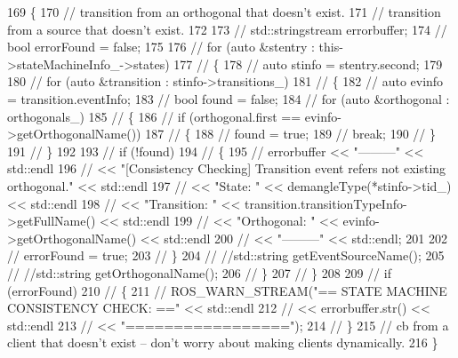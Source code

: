 \begin{DoxyCode}
169 \{
170     \textcolor{comment}{// transition from an orthogonal that doesn’t exist.}
171     \textcolor{comment}{// transition from a source that doesn’t exist.}
172 
173     \textcolor{comment}{// std::stringstream errorbuffer;}
174     \textcolor{comment}{// bool errorFound = false;}
175 
176     \textcolor{comment}{// for (auto &stentry : this->stateMachineInfo\_->states)}
177     \textcolor{comment}{// \{}
178     \textcolor{comment}{//     auto stinfo = stentry.second;}
179 
180     \textcolor{comment}{//     for (auto &transition : stinfo->transitions\_)}
181     \textcolor{comment}{//     \{}
182     \textcolor{comment}{//         auto evinfo = transition.eventInfo;}
183     \textcolor{comment}{//         bool found = false;}
184     \textcolor{comment}{//         for (auto &orthogonal : orthogonals\_)}
185     \textcolor{comment}{//         \{}
186     \textcolor{comment}{//             if (orthogonal.first == evinfo->getOrthogonalName())}
187     \textcolor{comment}{//             \{}
188     \textcolor{comment}{//                 found = true;}
189     \textcolor{comment}{//                 break;}
190     \textcolor{comment}{//             \}}
191     \textcolor{comment}{//         \}}
192 
193     \textcolor{comment}{//         if (!found)}
194     \textcolor{comment}{//         \{}
195     \textcolor{comment}{//             errorbuffer << "---------" << std::endl}
196     \textcolor{comment}{//                         << "[Consistency Checking] Transition event refers not existing orthogonal."
       << std::endl}
197     \textcolor{comment}{//                         << "State: " << demangleType(*stinfo->tid\_) << std::endl}
198     \textcolor{comment}{//                         << "Transition: " << transition.transitionTypeInfo->getFullName() <<
       std::endl}
199     \textcolor{comment}{//                         << "Orthogonal: " << evinfo->getOrthogonalName() << std::endl}
200     \textcolor{comment}{//                         << "---------" << std::endl;}
201 
202     \textcolor{comment}{//             errorFound = true;}
203     \textcolor{comment}{//         \}}
204     \textcolor{comment}{//         //std::string getEventSourceName();}
205     \textcolor{comment}{//         //std::string getOrthogonalName();}
206     \textcolor{comment}{//     \}}
207     \textcolor{comment}{// \}}
208 
209     \textcolor{comment}{// if (errorFound)}
210     \textcolor{comment}{// \{}
211     \textcolor{comment}{//     ROS\_WARN\_STREAM("== STATE MACHINE CONSISTENCY CHECK: ==" << std::endl}
212     \textcolor{comment}{//                                                              << errorbuffer.str() << std::endl}
213     \textcolor{comment}{//                                                              << "=================");}
214     \textcolor{comment}{// \}}
215     \textcolor{comment}{// cb from a client that doesn’t exist – don’t worry about making clients dynamically.}
216 \}
\end{DoxyCode}
